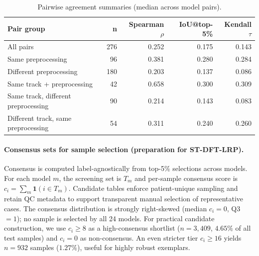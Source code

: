 \begin{table}[H]
  \centering
  \caption{Pairwise agreement summaries (median across model pairs).}
  \label{tab:pairwise_agreement_summary}
  \begin{tabular}{lrrrr}
    \toprule
    \textbf{Pair group}                 & \textbf{n} & \textbf{Spearman \(\rho\)} & \textbf{IoU@top-5\%} & \textbf{Kendall \(\tau\)} \\
    \midrule
    All pairs                           & 276        & 0.252                      & 0.175                & 0.143                     \\
    Same preprocessing                  & 96         & 0.381                      & 0.280                & 0.284                     \\
    Different preprocessing             & 180        & 0.203                      & 0.137                & 0.086                     \\
    Same track + preprocessing          & 42         & 0.658                      & 0.300                & 0.309                     \\
    Same track, different preprocessing & 90         & 0.214                      & 0.143                & 0.083                     \\
    Different track, same preprocessing & 54         & 0.311                      & 0.240                & 0.260                     \\
    \bottomrule
  \end{tabular}
\end{table}

\paragraph{Consensus sets for sample selection (preparation for ST-DFT-LRP).}
Consensus is computed label-agnostically from top-5\% selections across models.
For each model $m$, the screening set is $T_m$ and per-sample consensus score is $c_i=\sum_m \mathbf{1}(i\in T_m)$.
Candidate tables enforce patient-unique sampling and retain QC metadata to support transparent manual selection of representative cases.
The consensus distribution is strongly right-skewed (median \(c_i=0\), Q3 \(=1\)); no sample is selected by all 24 models.
For practical candidate construction, we use \(c_i \ge 8\) as a high-consensus shortlist (\(n=3{,}409\), \(4.65\%\) of all test samples) and \(c_i=0\) as non-consensus.
An even stricter tier \(c_i \ge 16\) yields \(n=932\) samples (\(1.27\%\)), useful for highly robust exemplars.

